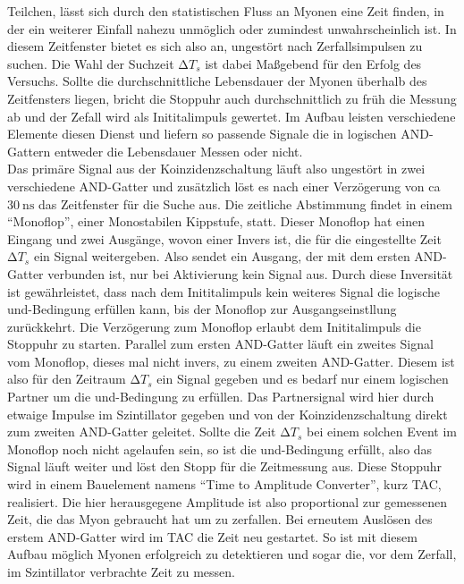 Teilchen, lässt sich durch den statistischen Fluss an Myonen eine Zeit finden, in der ein weiterer Einfall nahezu unmöglich oder zumindest unwahrscheinlich ist.
In diesem Zeitfenster bietet es sich also an, ungestört nach Zerfallsimpulsen zu suchen. Die Wahl der Suchzeit $\increment T_s$
ist dabei Maßgebend für den Erfolg des Versuchs. Sollte die durchschnittliche Lebensdauer der Myonen überhalb des Zeitfensters liegen, 
bricht die Stoppuhr auch durchschnittlich zu früh die Messung ab und der Zefall wird als Inititalimpuls gewertet. 
Im Aufbau leisten verschiedene Elemente diesen Dienst und liefern so passende Signale die in logischen AND-Gattern entweder die Lebensdauer Messen oder nicht.
\\
\newline
Das primäre Signal aus der Koinzidenzschaltung läuft also ungestört in zwei verschiedene AND-Gatter und zusätzlich löst es nach einer Verzögerung von ca $\SI{30}{\nano\second}$
das Zeitfenster für die Suche aus.
Die zeitliche Abstimmung findet in einem \enquote{Monoflop}, einer Monostabilen Kippstufe, statt. Dieser Monoflop
hat einen Eingang und zwei Ausgänge, wovon einer Invers ist, die für die eingestellte Zeit $\increment T_s$ ein Signal weitergeben. Also sendet ein Ausgang, der mit dem ersten AND-Gatter verbunden ist,
nur bei Aktivierung kein Signal aus. Durch diese Inversität ist gewährleistet, dass nach dem Inititalimpuls kein weiteres Signal die logische und-Bedingung erfüllen kann, bis 
der Monoflop zur Ausgangseinstllung zurückkehrt. Die Verzögerung zum Monoflop erlaubt dem Inititalimpuls die Stoppuhr zu starten. 
Parallel zum ersten AND-Gatter läuft ein zweites Signal vom Monoflop, dieses mal nicht invers, zu einem zweiten AND-Gatter.
Diesem ist also für den Zeitraum $\increment T_s$ ein Signal gegeben und es bedarf nur einem logischen Partner um die und-Bedingung zu erfüllen. 
Das Partnersignal wird hier durch etwaige Impulse im Szintillator gegeben und von der Koinzidenzschaltung direkt zum zweiten AND-Gatter geleitet.
Sollte die Zeit $\increment T_s$ bei einem solchen Event im Monoflop noch nicht agelaufen sein, so ist die und-Bedingung erfüllt,
also das Signal läuft weiter und löst den Stopp für die Zeitmessung aus.
Diese Stoppuhr wird in einem Bauelement namens \enquote{Time to Amplitude Converter}, kurz TAC, realisiert. 
Die hier herausgegene Amplitude ist also proportional zur gemessenen Zeit, die das Myon gebraucht hat um zu zerfallen. Bei erneutem Auslösen des erstem AND-Gatter wird 
im TAC die Zeit neu gestartet.
So ist mit diesem Aufbau möglich Myonen erfolgreich zu detektieren und sogar die, vor dem Zerfall, im Szintillator verbrachte Zeit zu messen.
